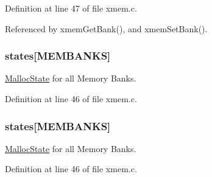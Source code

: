 Definition at line 47 of file xmem.\-c.



Referenced by xmem\-Get\-Bank(), and xmem\-Set\-Bank().

\hypertarget{group__xmem_gabe6eb8575dfb63d41e3ca7fe774d1b27}{
\subsubsection[{states}]{ states\mbox{[}{\bf M\-E\-M\-B\-A\-N\-K\-S}\mbox{]}}}\label{group__xmem_gabe6eb8575dfb63d41e3ca7fe774d1b27}


\hyperlink{struct_malloc_state}{Malloc\-State} for all Memory Banks. 



Definition at line 46 of file xmem.\-c.

\hypertarget{group__xmem_gabe6eb8575dfb63d41e3ca7fe774d1b27}{
\subsubsection[{states}]{ states\mbox{[}{\bf M\-E\-M\-B\-A\-N\-K\-S}\mbox{]}}}\label{group__xmem_gabe6eb8575dfb63d41e3ca7fe774d1b27}


\hyperlink{struct_malloc_state}{Malloc\-State} for all Memory Banks. 



Definition at line 46 of file xmem.\-c.

